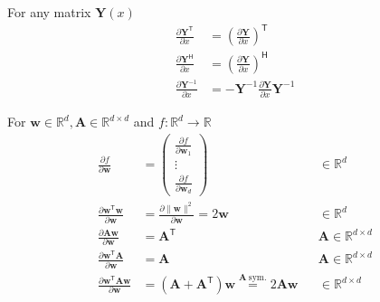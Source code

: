 \begin{multicols*}{3}
    
    For any matrix $\mathbf{Y}(x)$
    \noindent\begin{align*}
        \frac{\partial \mathbf{Y}^{\mathsf{T}}}{\partial x} & ={\left(\frac{\partial \mathbf{Y}}{\partial x}\right)}^{\mathsf{T}}   \\
        \frac{\partial \mathbf{Y}^{\mathsf{H}}}{\partial x} & ={\left(\frac{\partial \mathbf{Y}}{\partial x}\right)}^{\mathsf{H}}   \\
        \frac{\partial\mathbf{Y}^{-1}}{\partial x}          & =-\mathbf{Y}^{-1}\frac{\partial\mathbf{Y}}{\partial x}\mathbf{Y}^{-1}
    \end{align*}
    
    \newpar{}
    For $\mathbf{w}\in \mathbb{R}^d, \mathbf{A}\in \mathbb{R}^{d\times d}$ and $ f: \mathbb{R}^d\to \mathbb{R}$
    \noindent\begin{align*}
        \frac{\partial f}{\partial \mathbf{w}}                                  & =
        \begin{pmatrix}\frac{\partial f}{\partial \mathbf{w}_1} \\
            \vdots                                   \\
            \frac{\partial f}{\partial \mathbf{w}_d}
        \end{pmatrix} &                                                                                                                 & \in \mathbb{R}^d                                                                                                  \\[2em]
        \frac{\partial \mathbf{w}^{\mathsf{T}}\mathbf{w}}{\partial \mathbf{w}}  & =\frac{\partial\|\mathbf{w}\|^2}{\partial \mathbf{w}}=2\mathbf{w}                                               &                  & \in \mathbb{R}^d                     \\
        \frac{\partial \mathbf{A}\mathbf{w}}{\partial \mathbf{w}}               & ={\mathbf{A}}^{\mathsf{T}}                                                                                      &                  & \mathbf{A}\in \mathbb{R}^{d\times d} \\
        \frac{\partial \mathbf{w}^{\mathsf{T}}\mathbf{A}}{\partial \mathbf{w}}  & = \mathbf{A}                                                                                                    &                  & \mathbf{A}\in \mathbb{R}^{d\times d} \\
        \frac{\partial \mathbf{w}^{\mathsf{T}}\mathbf{Aw}}{\partial \mathbf{w}} & = \left(\mathbf{A}+\mathbf{A}^{\mathsf{T}}\right)\mathbf{w} \overset{\mathbf{A}\ \mathrm{sym.}}{=} 2\mathbf{Aw} &                  & \in \mathbb{R}^{d\times d}
    \end{align*}
\end{multicols*}

